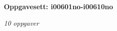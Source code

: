 \centerline{\bf Oppgavesett: i00601no-i00610no}
\vskip 10pt
\centerline{\it 10 oppgaver}\vskip 10pt
\vskip 10pt
